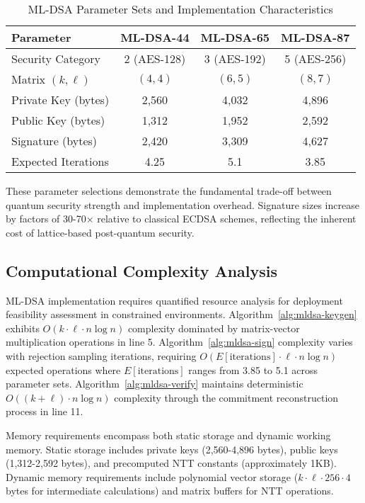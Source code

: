 \documentclass[journal=tches,final]{iacrtrans}
\begin{document}
\begin{table}[h]
  \centering
  \caption{ML-DSA Parameter Sets and Implementation Characteristics}
  \label{tab:mldsa-params}
  \begin{tabular}{lccc}
    \hline
    \textbf{Parameter} & \textbf{ML-DSA-44} & \textbf{ML-DSA-65} & \textbf{ML-DSA-87} \\
    \hline
    Security Category & 2 (AES-128) & 3 (AES-192) & 5 (AES-256) \\
    Matrix $(k,\ell)$ & $(4,4)$ & $(6,5)$ & $(8,7)$ \\
    Private Key (bytes) & 2,560 & 4,032 & 4,896 \\
    Public Key (bytes) & 1,312 & 1,952 & 2,592 \\
    Signature (bytes) & 2,420 & 3,309 & 4,627 \\
    Expected Iterations & 4.25 & 5.1 & 3.85 \\
    \hline
  \end{tabular}
\end{table}

These parameter selections demonstrate the fundamental trade-off between quantum security strength and implementation overhead. Signature sizes increase by factors of 30-70× relative to classical ECDSA schemes, reflecting the inherent cost of lattice-based post-quantum security.

\subsection{Computational Complexity Analysis}

ML-DSA implementation requires quantified resource analysis for deployment feasibility assessment in constrained environments. Algorithm~\ref{alg:mldsa-keygen} exhibits $O(k \cdot \ell \cdot n \log n)$ complexity dominated by matrix-vector multiplication operations in line 5. Algorithm~\ref{alg:mldsa-sign} complexity varies with rejection sampling iterations, requiring $O(E[\text{iterations}] \cdot \ell \cdot n \log n)$ expected operations where $E[\text{iterations}]$ ranges from 3.85 to 5.1 across parameter sets. Algorithm~\ref{alg:mldsa-verify} maintains deterministic $O((k + \ell) \cdot n \log n)$ complexity through the commitment reconstruction process in line 11.

Memory requirements encompass both static storage and dynamic working memory. Static storage includes private keys (2,560-4,896 bytes), public keys (1,312-2,592 bytes), and precomputed NTT constants (approximately 1KB). Dynamic memory requirements include polynomial vector storage ($k \cdot \ell \cdot 256 \cdot 4$ bytes for intermediate calculations) and matrix buffers for NTT operations.
\end{document}
